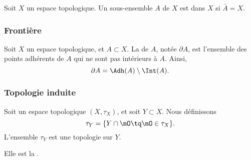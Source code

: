 \begin{definition}\label{DefEnsembleDense}
	Soit \( X \) un espace topologique. Un sous-ensemble \( A \) de \( X \) est  dans \( X \) si \( \bar A = X\).
\end{definition}

\subsubsection{Frontière}

\begin{definition}
	Soit \( X \) un espace topologique, et \( A \subset X \). La  de \( A \), notée \( \partial A \), est l'ensemble des points adhérents de \( A \) qui ne sont pas intérieurs à \( A \). Ainsi,
	\begin{equation}
		\partial A = \Adh(A) \setminus \Int(A).
	\end{equation}
\end{definition}

\subsubsection{Topologie induite}

\begin{propositionDef} \label{DefVLrgWDB}
	Soit un espace topologique \( (X, \tau_X) \), et soit \( Y \subset X \). Nous définissons
	\begin{equation}
		\tau_Y=\{ Y\cap\mO\tq \mO\in\tau_X \}.
	\end{equation}
	L'ensemble \( \tau_Y\) est une topologie sur \( Y\).

	Elle est la .
\end{propositionDef}

